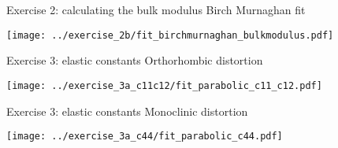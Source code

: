 \documentclass[xcolor=table]{beamer}
\begin{document}
\begin{frame}{Exercise 2: calculating the bulk modulus}
  Birch Murnaghan fit
  \begin{center}
    \texttt{[image: ../exercise\_2b/fit\_birchmurnaghan\_bulkmodulus.pdf]}
  \end{center}
\end{frame}

\begin{frame}{Exercise 3: elastic constants}
  Orthorhombic distortion
  \begin{center}
    \texttt{[image: ../exercise\_3a\_c11c12/fit\_parabolic\_c11\_c12.pdf]}
  \end{center}
\end{frame}

\begin{frame}{Exercise 3: elastic constants}
  Monoclinic distortion
  \begin{center}
    \texttt{[image: ../exercise\_3a\_c44/fit\_parabolic\_c44.pdf]}
  \end{center}
\end{frame}
\end{document}
